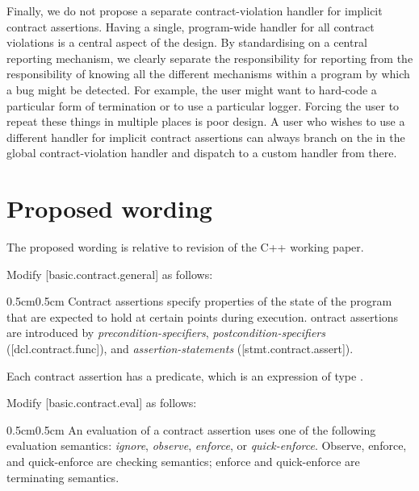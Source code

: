 {Finally, we do not propose a separate contract-violation handler for implicit contract assertions. Having a single, program-wide handler for all contract violations is a central aspect of the \cite{P2900R14} design. By standardising on a central reporting mechanism, we clearly separate the responsibility for reporting from the responsibility of knowing all the different mechanisms within a program by which a bug might be detected. For example, the user might want to hard-code a particular form of termination or to use a particular logger. Forcing the user to repeat these things in multiple places is poor design. A user who wishes to use a different handler for implicit contract assertions can always branch on the  in the global contract-violation handler and dispatch to a custom handler from there.


\section{Proposed wording}
\label{wording}

The proposed wording is relative to revision \cite{N5008} of the C++ working paper.

Modify [basic.contract.general] as follows:

\begin{adjustwidth}{0.5cm}{0.5cm}
Contract assertions specify properties of the state of the program
that are expected to hold at certain points during execution. ontract assertions
are introduced by \emph{precondition-specifiers}, \emph{postcondition-specifiers} ([dcl.contract.func]),
and \emph{assertion-statements} ([stmt.contract.assert]). 

Each contract assertion has a predicate, which is an expression of type . 
\begin{note}
\end{note}
\end{adjustwidth}

Modify [basic.contract.eval] as follows:

\begin{adjustwidth}{0.5cm}{0.5cm}
An evaluation of a contract assertion uses one of the following  evaluation semantics: 
\emph{ignore}, 
\emph{observe}, 
\emph{enforce}, or 
\emph{quick-enforce}. 
Observe, enforce, and quick-enforce are checking semantics; enforce and quick-enforce are terminating semantics.


\end{adjustwidth}}
